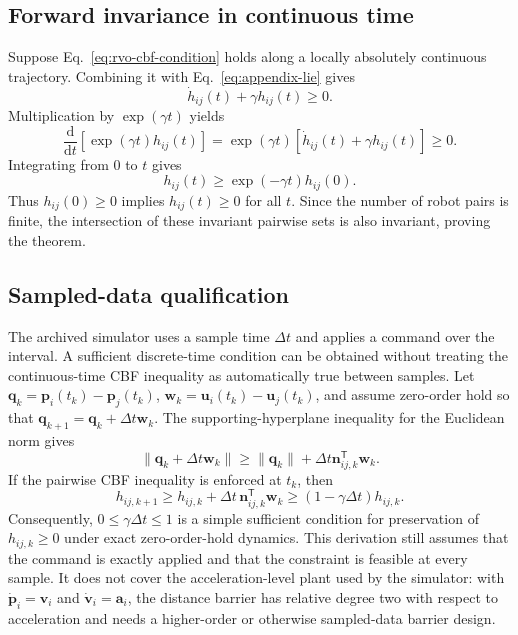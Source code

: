 \documentclass[pdflatex,sn-mathphys-num]{sn-jnl}
\begin{document}
\subsection{Forward invariance in continuous time}

Suppose Eq.~\ref{eq:rvo-cbf-condition} holds along a locally absolutely continuous trajectory. Combining it with Eq.~\ref{eq:appendix-lie} gives
\begin{equation}
\dot h_{ij}(t)+\gamma h_{ij}(t)\geq0.
\label{eq:appendix-differential-inequality}
\end{equation}
Multiplication by $\exp(\gamma t)$ yields
\begin{equation}
\frac{\mathrm{d}}{\mathrm{d}t}\left[\exp(\gamma t)h_{ij}(t)\right]
 =\exp(\gamma t)\left[\dot h_{ij}(t)+\gamma h_{ij}(t)\right]\geq0.
\label{eq:appendix-comparison}
\end{equation}
Integrating from $0$ to $t$ gives
\begin{equation}
h_{ij}(t)\geq\exp(-\gamma t)h_{ij}(0).
\label{eq:appendix-bound}
\end{equation}
Thus $h_{ij}(0)\geq0$ implies $h_{ij}(t)\geq0$ for all $t$. Since the number of robot pairs is finite, the intersection of these invariant pairwise sets is also invariant, proving the theorem.

\subsection{Sampled-data qualification}

The archived simulator uses a sample time $\Delta t$ and applies a command over the interval. A sufficient discrete-time condition can be obtained without treating the continuous-time CBF inequality as automatically true between samples. Let $\mathbf{q}_k=\mathbf{p}_i(t_k)-\mathbf{p}_j(t_k)$, $\mathbf{w}_k=\mathbf{u}_i(t_k)-\mathbf{u}_j(t_k)$, and assume zero-order hold so that $\mathbf{q}_{k+1}=\mathbf{q}_k+\Delta t\mathbf{w}_k$. The supporting-hyperplane inequality for the Euclidean norm gives
\begin{equation}
\lVert \mathbf{q}_k+\Delta t\mathbf{w}_k\rVert
\geq \lVert \mathbf{q}_k\rVert+\Delta t\mathbf{n}_{ij,k}^{\mathsf T}\mathbf{w}_k.
\label{eq:appendix-sampled-norm}
\end{equation}
If the pairwise CBF inequality is enforced at $t_k$, then
\begin{equation}
h_{ij,k+1}\geq h_{ij,k}+\Delta t\,\mathbf{n}_{ij,k}^{\mathsf T}\mathbf{w}_k
\geq (1-\gamma\Delta t)h_{ij,k}.
\label{eq:appendix-sampled-bound}
\end{equation}
Consequently, $0\leq\gamma\Delta t\leq1$ is a simple sufficient condition for preservation of $h_{ij,k}\geq0$ under exact zero-order-hold dynamics. This derivation still assumes that the command is exactly applied and that the constraint is feasible at every sample. It does not cover the acceleration-level plant used by the simulator: with $\dot{\mathbf{p}}_i=\mathbf{v}_i$ and $\dot{\mathbf{v}}_i=\mathbf{a}_i$, the distance barrier has relative degree two with respect to acceleration and needs a higher-order or otherwise sampled-data barrier design.
\end{document}
